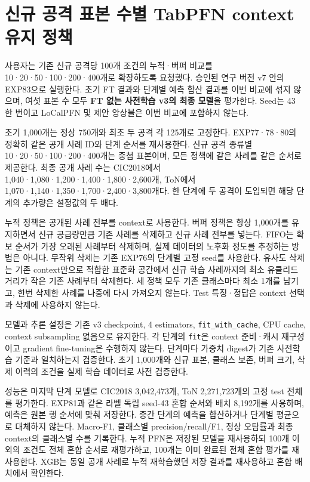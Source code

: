 \section{신규 공격 표본 수별 TabPFN context 유지 정책}
사용자는 기존 신규 공격당 100개 조건의 누적·버퍼 비교를 10·20·50·100·200·400개로 확장하도록 요청했다. 승인된 연구 버전 v7 안의 EXP83으로 실행한다. 초기 FT 결과와 단계별 예측 합산 결과를 이번 비교에 섞지 않으며, 여섯 표본 수 모두 \textbf{FT 없는 사전학습 v3의 최종 모델}을 평가한다. Seed는 43 한 번이고 LoCalPFN 및 제안 앙상블은 이번 비교에 포함하지 않는다.

초기 1,000개는 정상 750개와 최초 두 공격 각 125개로 고정한다. EXP77·78·80의 정확히 같은 공개 사례 ID와 단계 순서를 재사용한다. 신규 공격 종류별 10·20·50·100·200·400개는 중첩 표본이며, 모든 정책에 같은 사례를 같은 순서로 제공한다. 최종 공개 사례 수는 CIC2018에서 1,040·1,080·1,200·1,400·1,800·2,600개, ToN에서 1,070·1,140·1,350·1,700·2,400·3,800개다. 한 단계에 두 공격이 도입되면 해당 단계의 추가량은 설정값의 두 배다.

누적 정책은 공개된 사례 전부를 context로 사용한다. 버퍼 정책은 항상 1,000개를 유지하면서 신규 공급량만큼 기존 사례를 삭제하고 신규 사례 전부를 넣는다. FIFO는 확보 순서가 가장 오래된 사례부터 삭제하며, 실제 데이터의 노후화 정도를 추정하는 방법은 아니다. 무작위 삭제는 기존 EXP76의 단계별 고정 seed를 사용한다. 유사도 삭제는 기존 context만으로 적합한 표준화 공간에서 신규 학습 사례까지의 최소 유클리드 거리가 작은 기존 사례부터 삭제한다. 세 정책 모두 기존 클래스마다 최소 1개를 남기고, 한번 삭제한 사례를 나중에 다시 가져오지 않는다. Test 특징·정답은 context 선택과 삭제에 사용하지 않는다.

모델과 추론 설정은 기존 v3 checkpoint, 4 estimators, \texttt{fit\_\allowbreak{}\allowbreak{}with\allowbreak{}\_\allowbreak{}\allowbreak{}cache}, CPU cache, context subsampling 없음으로 유지한다. 각 단계의 \texttt{fit}은 context 준비·캐시 재구성이고 gradient fine-tuning은 수행하지 않는다. 단계마다 가중치 digest가 기존 사전학습 기준과 일치하는지 검증한다. 초기 1,000개와 신규 표본, 클래스 보존, 버퍼 크기, 삭제 이력의 조건을 실제 학습 데이터로 사전 검증한다.

성능은 마지막 단계 모델로 CIC2018 3,042,473개, ToN 2,271,723개의 고정 test 전체를 평가한다. EXP81과 같은 라벨 독립 seed-43 혼합 순서와 배치 8,192개를 사용하며, 예측은 원본 행 순서에 맞춰 저장한다. 중간 단계의 예측을 합산하거나 단계별 평균으로 대체하지 않는다. Macro-F1, 클래스별 precision/\allowbreak{}recall/\allowbreak{}F1, 정상 오탐률과 최종 context의 클래스별 수를 기록한다. 누적 PFN은 저장된 모델을 재사용하되 100개 이외의 조건도 전체 혼합 순서로 재평가하고, 100개는 이미 완료된 전체 혼합 평가를 재사용한다. XGB는 동일 공개 사례로 누적 재학습했던 저장 결과를 재사용하고 혼합 배치에서 확인한다.

